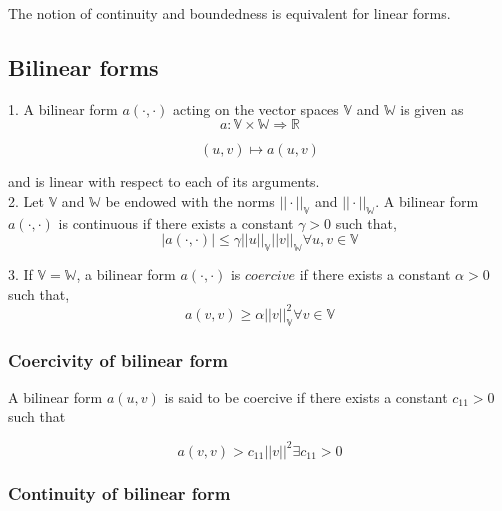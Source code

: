 \documentclass[a4paper,12pt]{book}
\begin{document}
The notion of continuity and boundedness is equivalent for linear forms.

\subsection{Bilinear forms}\cite{crbm}

1. A bilinear form $a(\cdot,\cdot)$ acting on the vector spaces $\mathbb{V}$ and $\mathbb{W}$ is given as
\begin{equation}
a : \mathbb{V} \times \mathbb{W} \Rightarrow \mathbb{R}
\end{equation}

\begin{equation}
(u,v) \mapsto a(u,v)
\end{equation}

and is linear with respect to each of its arguments.\\

2. Let $\mathbb{V}$ and $\mathbb{W}$ be endowed with the norms $||\cdot||_\mathbb{V}$ and $||\cdot||_\mathbb{W}$. A bilinear form $a(\cdot,\cdot)$ is continuous if there exists a constant $\gamma > 0$ such that,
\begin{equation}
|a(\cdot,\cdot)| \leq \gamma ||u||_\mathbb{V} ||v||_\mathbb{W} \forall u,v \in \mathbb{V}
\end{equation}

3. If $\mathbb{V} = \mathbb{W}$, a bilinear form $a(\cdot,\cdot)$ is $coercive$ if there exists a constant $\alpha > 0$ such that,
\begin{equation}
a(v,v) \geq \alpha ||v||_\mathbb{V}^2 \forall v \in \mathbb{V}
\end{equation}

\subsubsection{Coercivity of bilinear form} \label{Coercivity_constant}

A bilinear form $a(u,v)$ is said to be coercive if there exists a constant $c_{11} > 0$ such that

\begin{equation}\label{Coercivity}
a(v,v) > c_{11} ||v||^2   \exists   c_{11} > 0
\end{equation}

\subsubsection{Continuity of bilinear form}
\end{document}
